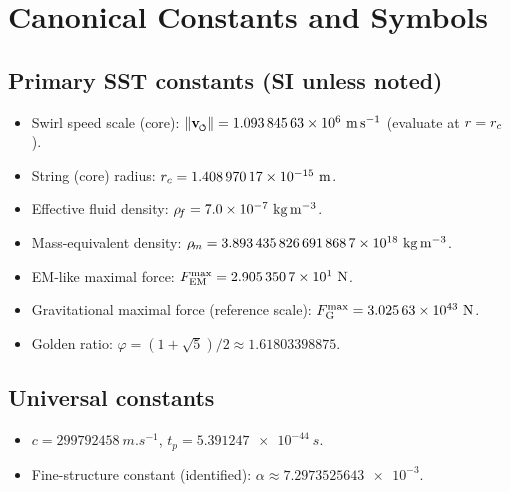 \documentclass[11pt]{article}
\begin{document}
\section{Canonical Constants and Symbols}
\label{sec:canonical_constants}
    \subsection*{Primary SST constants (SI unless noted)}
    \begin{itemize}
        \item Swirl speed scale (core): $\vnorm = \num{1.09384563e6}\ \si{m.s^{-1}}$ (evaluate at $r=\rc$).
        \item String (core) radius: $\rc = \num{1.40897017e-15}\ \si{m}$.
        \item Effective fluid density: $\rhof = \num{7.0e-7}\ \si{kg.m^{-3}}$.
        \item Mass-equivalent density: $\rhom = \num{3.8934358266918687e18}\ \si{kg.m^{-3}}$. %
        \item EM-like maximal force: $\FmaxEM = \num{2.9053507e1}\ \si{N}$.
        \item Gravitational maximal force (reference scale): $\FmaxG = \num{3.02563e43}\ \si{N}$.
        \item Golden ratio: $\varphi = (1+\sqrt{5})/2 \approx \num{1.61803398875}$.
    \end{itemize}

    \subsection*{Universal constants}
    \begin{itemize}
        \item $c=\num{299792458}\ \si{m.s^{-1}}$, \quad $t_p=\num{5.391247e-44}\ \si{s}$.
        \item Fine-structure constant (identified): $\alpha \approx \num{7.2973525643e-3}$.
    \end{itemize}
\end{document}
